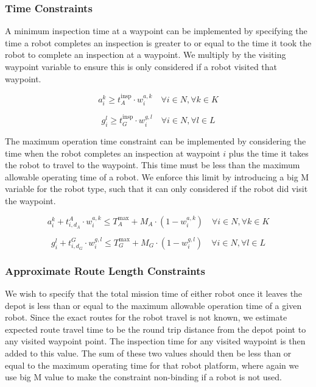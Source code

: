 \documentclass{article}
\begin{document}
			\subsubsection{Time Constraints}

				A minimum inspection time at a waypoint can be implemented by specifying the time a robot completes an inspection is greater to or equal to the time it took the robot to complete an inspection at a waypoint.
				We multiply by the visiting waypoint variable to ensure this is only considered if a robot visited that waypoint.

				\begin{equation}
					a_i^k \geq t_A^{\text{insp}} \cdot w_i^{a,k} \quad \forall i \in N, \forall k \in K
				\end{equation}

				\begin{equation}
					g_i^l \geq t_G^{\text{insp}} \cdot w_i^{g,l} \quad \forall i \in N, \forall l \in L
				\end{equation}

				The maximum operation time constraint can be implemented by considering the time when the robot completes an inspection at waypoint $i$ plus the time it takes the robot to travel to the waypoint.
				This time must be less than the maximum allowable operating time of a robot. We enforce this limit by introducing a big M variable for the robot type, such that it can only considered if the robot did visit the waypoint.

				\begin{equation}
					a_i^k + t_{i,d_A}^{A} \cdot w_i^{a,k} \leq T_A^{\max} + M_A \cdot (1 - w_i^{a,k}) \quad \forall i \in N, \forall k \in K
				\end{equation}

				\begin{equation}
					g_i^l + t_{i,d_G}^{G} \cdot w_i^{g,l} \leq T_G^{\max} + M_G \cdot (1 - w_i^{g,l}) \quad \forall i \in N, \forall l \in L
				\end{equation}

			\subsubsection{Approximate Route Length Constraints}

				We wish to specify that the total mission time of either robot once it leaves the depot is less than or equal to the maximum allowable operation time of a given robot.
				Since the exact routes for the robot travel is not known, we estimate expected route travel time to be the round trip distance from the depot point to any visited waypoint point. 
				The inspection time for any visited waypoint is then added to this value.
				The sum of these two values should then be less than or equal to the maximum operating time for that robot platform, where again we use big M value to make the constraint non-binding if a robot is not used.
				
\end{document}
